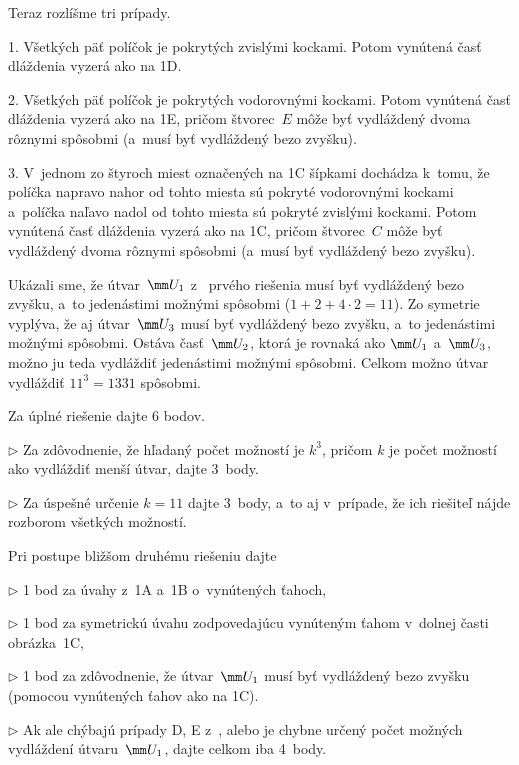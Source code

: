 {Teraz rozlíšme tri prípady.

1. Všetkých päť políčok je pokrytých zvislými kockami. Potom vynútená časť
dláždenia vyzerá ako na \obrr1D.

2. Všetkých päť políčok je pokrytých vodorovnými kockami. Potom vynútená časť
dláždenia vyzerá ako na \obrr1E, pričom štvorec~$E$ môže byť vydláždený
dvoma rôznymi spôsobmi (a~musí byť vydláždený bezo zvyšku).

3. V~jednom zo štyroch miest označených na \obrr1C šípkami dochádza
k~tomu, že políčka napravo nahor od tohto miesta sú pokryté vodorovnými
kockami a~políčka naľavo nadol od tohto miesta sú pokryté zvislými
kockami. Potom vynútená časť dláždenia vyzerá ako na \obrr1C, pričom
štvorec~$C$ môže byť vydláždený dvoma rôznymi spôsobmi (a~musí byť
vydláždený bezo zvyšku).

Ukázali sme, že útvar~$\mm U_1$ z~ prvého riešenia musí byť
vydláždený bezo zvyšku, a~to jedenástimi možnými spôsobmi ($1+2+4\cdot
2=11$). Zo symetrie vyplýva, že aj útvar~$\mm U_3$ musí byť vydláždený bezo
zvyšku, a~to jedenástimi možnými spôsobmi. Ostáva časť~$\mm U_2$, ktorá je
rovnaká ako $\mm U_1$ a~$\mm U_3$, možno ju teda vydláždiť jedenástimi možnými
spôsobmi. Celkom možno útvar vydláždiť $11^3=1331$ spôsobmi.


\nobreak\medskip\petit\noindent
Za úplné riešenie dajte 6 bodov.
\item{$\triangleright$} Za zdôvodnenie, že hľadaný počet možností je $k^3$, pričom $k$ je
počet možností ako vydláždiť menší útvar, dajte 3~body.
\item{$\triangleright$} Za úspešné určenie $k=11$ dajte 3~body, a~to aj v~prípade, že ich
riešiteľ nájde rozborom všetkých možností.

Pri postupe bližšom druhému riešeniu dajte
\item{$\triangleright$} 1 bod za úvahy z~\obrr1A a~\obrr1B o~vynútených ťahoch,
\item{$\triangleright$} 1 bod za symetrickú úvahu zodpovedajúcu vynúteným ťahom v~dolnej časti obrázka~\obrrnum1C,
\item{$\triangleright$} 1 bod za zdôvodnenie, že útvar~$\mm U_1$ musí byť vydláždený bezo zvyšku
(pomocou vynútených ťahov ako na \obrr1C).
\item{$\triangleright$} Ak ale chýbajú prípady D, E z~, alebo je chybne určený počet možných
vydláždení útvaru~$\mm U_1$, dajte celkom iba 4~body.
\endpetit}

